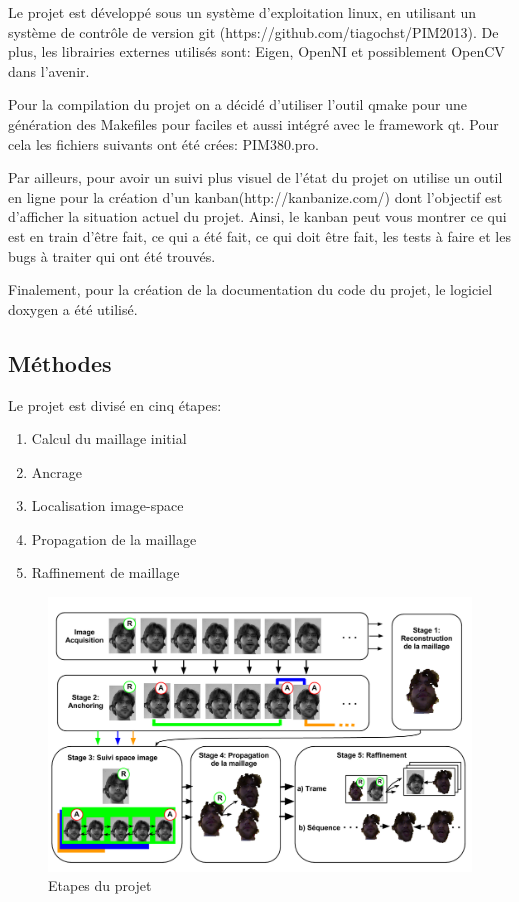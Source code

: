 \documentclass[a4paper,10pt]{article}
\begin{document}
Le projet est développé sous un système d'exploitation linux, en utilisant un système de contrôle de version git (https://github.com/tiagochst/PIM2013). 
De plus, les librairies externes utilisés sont: Eigen, OpenNI et possiblement OpenCV dans l’avenir.

Pour la compilation du projet on a décidé d’utiliser l’outil qmake pour une génération des Makefiles pour faciles et aussi intégré avec le framework qt. 
Pour cela les fichiers suivants ont été crées: PIM380.pro. 

Par ailleurs, pour avoir un suivi plus visuel de l’état du projet on utilise un outil en ligne pour la création d’un kanban(http://kanbanize.com/) dont l’objectif est d’afficher la situation actuel du projet. Ainsi, le kanban peut vous montrer ce qui est en train d’être fait, ce qui a été fait, ce qui doit être fait, les tests à faire et les bugs à traiter qui ont été trouvés.

Finalement, pour la création de la documentation du code du projet, le logiciel doxygen a été utilisé. 


\subsection{Méthodes}

Le projet est divisé en cinq étapes: 

\begin{enumerate}
\item Calcul du maillage initial
\item Ancrage
\item Localisation image-space
\item Propagation de la maillage
\item Raffinement de maillage
\end{enumerate}


\begin{figure}[h!]
  \begin{center}
    \includegraphics[scale=0.4]{img/projDiagram.png}
    \caption{Etapes du projet}
  \end{center}
\end{figure}
\end{document}
